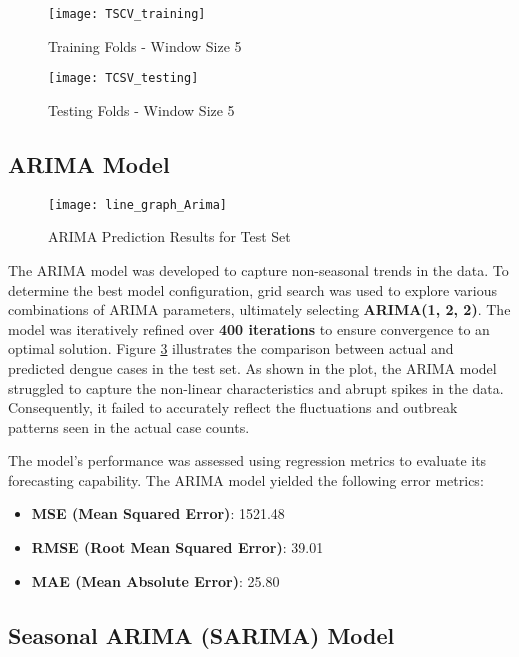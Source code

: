 \begin{figure}[H]
	\centering
	\texttt{[image: TSCV\_training]}
	\caption{Training Folds - Window Size 5}
	\label{fig:tcsv_training}
\end{figure}

\begin{figure}[H]
	\centering
	\texttt{[image: TCSV\_testing]}
	\caption{Testing Folds - Window Size 5}
	\label{fig:tcsv_testing}
\end{figure}

\subsection{ARIMA Model}



\begin{figure}[H]
	\centering
	\texttt{[image: line\_graph\_Arima]}
	\caption{ARIMA Prediction Results for Test Set}
	\label{fig:Arima_result}
\end{figure}

The ARIMA model was developed to capture non-seasonal trends in the data. To determine the best model configuration, grid search was used to explore various combinations of ARIMA parameters, ultimately selecting \textbf{ARIMA(1, 2, 2)}. The model was iteratively refined over \textbf{400 iterations} to ensure convergence to an optimal solution. Figure \ref{fig:Arima_result} illustrates the comparison between actual and predicted dengue cases in the test set. As shown in the plot, the ARIMA model struggled to capture the non-linear characteristics and abrupt spikes in the data. Consequently, it failed to accurately reflect the fluctuations and outbreak patterns seen in the actual case counts.

The model's performance was assessed using regression metrics to evaluate its forecasting capability. The ARIMA model yielded the following error metrics:

\begin{itemize}
	\item \textbf{MSE (Mean Squared Error)}: 1521.48
	\item \textbf{RMSE (Root Mean Squared Error)}: 39.01
	\item \textbf{MAE (Mean Absolute Error)}: 25.80
\end{itemize}

\subsection{Seasonal ARIMA (SARIMA) Model}

